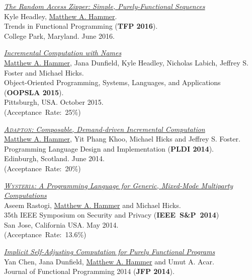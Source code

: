 \documentclass[10pt,letterpaper]{article}
\newcommand{\BeanCounter}[1]{(Acceptance~Rate:~#1\%)}
\renewenvironment{itemize}{
  \begin{list}{}{
    \setlength{\leftmargin}{1.5em}
    \setlength{\itemsep}{0.25em}
    \setlength{\parskip}{0pt}
    \setlength{\parsep}{0.25em}
  }
}{
  \end{list}
}
\begin{document}
\begin{itemize}
\item
\href{https://arxiv.org/abs/1608.06009}{\textit{The Random Access Zipper: Simple, Purely-Functional Sequences}}
\\
Kyle Headley, \underline{Matthew A. Hammer}.
\\
Trends in Functional Programming (\textbf{TFP 2016}).
\\
College Park, Maryland. June 2016. 

\item
\href{http://arxiv.org/abs/1503.07792}
{\textit{Incremental Computation with Names}}
\\
\underline{Matthew A. Hammer}, Jana Dunfield, Kyle Headley, Nicholas Labich,
Jeffrey S. Foster and Michael Hicks.
\\
Object-Oriented Programming, Systems, Languages, and Applications
(\textbf{OOPSLA 2015}).
\\
Pittsburgh, USA. October 2015.
\\
\BeanCounter{25}

\item
\href{http://www.cs.umd.edu/~hammer/adapton}
{\textit{\textsc{Adapton}: Composable, Demand-driven Incremental Computation}}
\\
\underline{Matthew A. Hammer}, Yit Phang Khoo, Michael Hicks and Jeffrey S. Foster.
\\
Programming Language Design and Implementation (\textbf{PLDI 2014}).
\\
Edinburgh, Scotland. June 2014.
\\
\BeanCounter{20}

\item
\href{http://www.cs.umd.edu/~hammer/oakland2014}
{\textit{\textsc{Wysteria}: A Programming Language for Generic, Mixed-Mode Multiparty Computations}}
\\
Aseem Rastogi, \underline{Matthew A. Hammer} and Michael Hicks.
\\
35th IEEE Symposium on Security and Privacy (\textbf{IEEE~S\&P~2014})
\\
San Jose, California USA. May 2014.
\\
\BeanCounter{13.6}

\item
\href{http://www.cs.umd.edu/~hammer/jfp2014}
{\textit{Implicit Self-Adjusting Computation for Purely Functional Programs}}
\\
Yan Chen, Jana Dunfield, \underline{Matthew A. Hammer} and Umut A. Acar.
\\
Journal of Functional Programming 2014 (\textbf{JFP 2014}).


\end{itemize}
\end{document}
